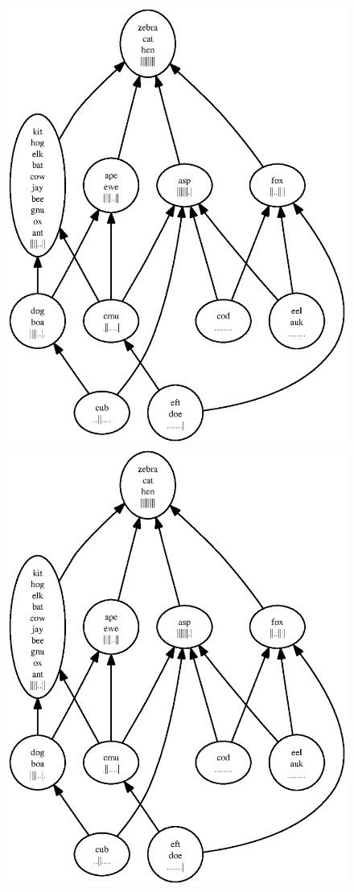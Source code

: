 \documentclass[11pt]{article}
\begin{document}
\begin{figure}
\centering
\includegraphics[scale=0.5]{rank1.ps}
\includegraphics[scale=0.5]{rank2.ps}

\end{figure}
\end{document}
